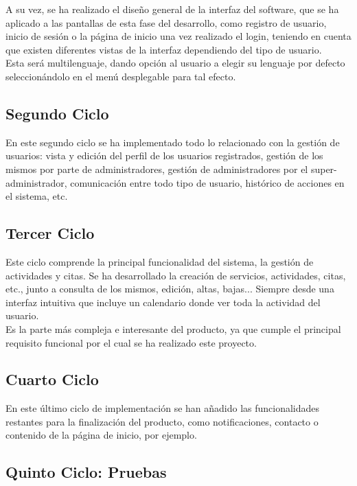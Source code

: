A su vez, se ha realizado el diseño general de la interfaz del software, que se ha aplicado a las pantallas de esta fase del desarrollo, como registro de usuario, inicio de sesión o la página de inicio una vez realizado el login, teniendo en cuenta que existen diferentes vistas de la interfaz dependiendo del tipo de usuario. \\
Esta será multilenguaje, dando opción al usuario a elegir su lenguaje por defecto seleccionándolo en el menú desplegable para tal efecto.

\subsection{Segundo Ciclo}

En este segundo ciclo se ha implementado todo lo relacionado con la gestión de usuarios: vista y edición del perfil de los usuarios registrados, gestión de los mismos por parte de administradores, gestión de administradores por el super-administrador, comunicación entre todo tipo de usuario, histórico de acciones en el sistema, etc.

\subsection{Tercer Ciclo}

Este ciclo comprende la principal funcionalidad del sistema, la gestión de actividades y citas. Se ha desarrollado la creación de servicios, actividades, citas, etc., junto a consulta de los mismos, edición, altas, bajas... Siempre desde una interfaz intuitiva que incluye un calendario donde ver toda la actividad del usuario. \\

Es la parte más compleja e interesante del producto, ya que cumple el principal requisito funcional por el cual se ha realizado este proyecto.

\subsection{Cuarto Ciclo}

En este último ciclo de implementación se han añadido las funcionalidades restantes para la finalización del producto, como notificaciones, contacto o contenido de la página de inicio, por ejemplo. 


\subsection{Quinto Ciclo: Pruebas}

